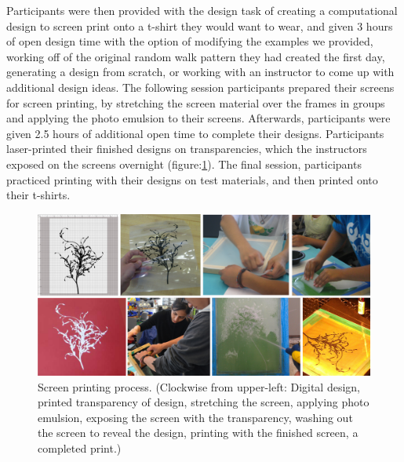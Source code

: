 \documentclass{sigchi}
\begin{document}
Participants were then provided with the design task of creating a computational design to screen print onto a t-shirt they would want to wear, and given 3 hours of open design time with the option of modifying the examples we provided, working off of the original random walk pattern they had created the first day, generating a design from scratch, or working with an instructor to come up with additional design ideas. The following session participants prepared their screens for screen printing, by stretching the screen material over the frames in groups and applying the photo emulsion to their screens. Afterwards, participants were given 2.5 hours of additional open time to complete their designs. Participants laser-printed their finished designs on transparencies, which the instructors exposed on the screens overnight (figure:\ref{fig:screen_printing_process}). The final session, participants practiced printing with their designs on test materials, and then printed onto their t-shirts.
\begin{center}
\begin{figure}[h!]
\includegraphics[width=\columnwidth]{images/screen_printing_process.png}
\caption{Screen printing process. (Clockwise from upper-left: Digital design, printed transparency of design, stretching the screen, applying photo emulsion, exposing the screen with the transparency, washing out the screen to reveal the design, printing with the finished screen, a completed print.) }
\label{fig:screen_printing_process}
\end{figure}
\end{center}
\vspace{-20pt}
\end{document}
